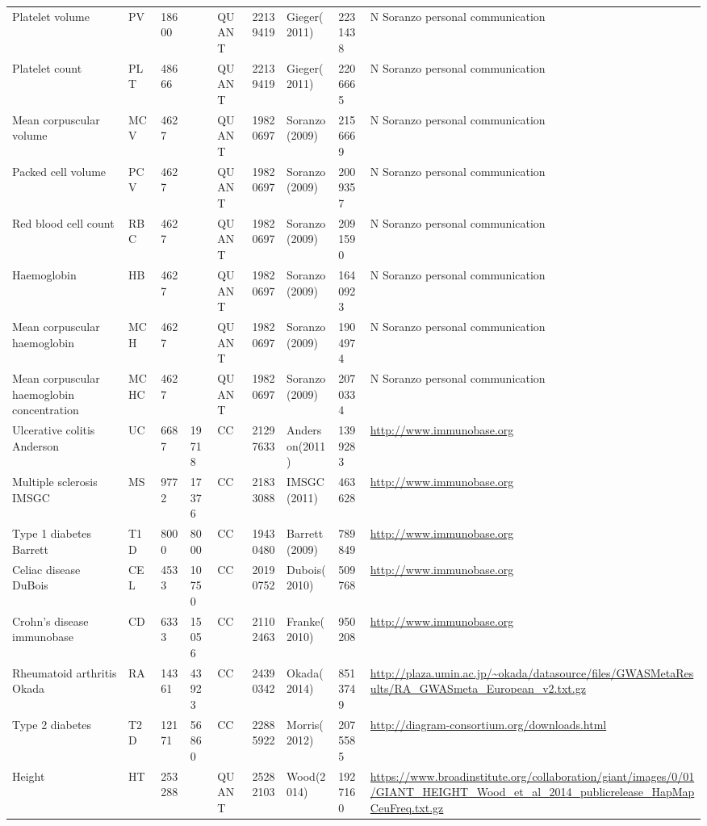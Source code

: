 \begin{center}
\begin{longtable}{| L{5cm} | C{1.2cm} | C{1cm} | C{1.5cm} | C{1.5cm} | C{1.5cm} | L{2.5cm} | R{1.5cm} | L{4cm} |}
Platelet volume & PV & 18600 &  & QUANT & 22139419 & Gieger(2011) & 2231438  & N Soranzo personal communication \\
Platelet count & PLT & 48666 &  & QUANT & 22139419 & Gieger(2011) & 2206665  & N Soranzo personal communication \\
Mean corpuscular volume & MCV & 4627 &  & QUANT & 19820697 & Soranzo(2009) & 2156669  & N Soranzo personal communication \\
Packed cell volume & PCV & 4627 &  & QUANT & 19820697 & Soranzo(2009) & 2009357  & N Soranzo personal communication \\
Red blood cell count & RBC & 4627 &  & QUANT & 19820697 & Soranzo(2009) & 2091590  & N Soranzo personal communication \\
Haemoglobin & HB & 4627 &  & QUANT & 19820697 & Soranzo(2009) & 1640923  & N Soranzo personal communication \\
Mean corpuscular haemoglobin & MCH & 4627 &  & QUANT & 19820697 & Soranzo(2009) & 1904974  & N Soranzo personal communication \\
Mean corpuscular haemoglobin concentration & MCHC & 4627 &  & QUANT & 19820697 & Soranzo(2009) & 2070334  & N Soranzo personal communication \\
Ulcerative colitis Anderson & UC & 6687 & 19718 & CC & 21297633 & Anderson(2011) & 1399283  & \url{http://www.immunobase.org} \\
Multiple sclerosis IMSGC & MS & 9772 & 17376 & CC & 21833088 & IMSGC(2011) & 463628  & \url{http://www.immunobase.org} \\
Type 1 diabetes Barrett & T1D & 8000 & 8000 & CC & 19430480 & Barrett(2009) & 789849  & \url{http://www.immunobase.org} \\
Celiac disease DuBois & CEL & 4533 & 10750 & CC & 20190752 & Dubois(2010) & 509768  & \url{http://www.immunobase.org} \\
Crohn's disease immunobase & CD & 6333 & 15056 & CC & 21102463 & Franke(2010) & 950208  & \url{http://www.immunobase.org} \\
Rheumatoid arthritis Okada & RA & 14361 & 43923 & CC & 24390342 & Okada(2014) & 8513749  & \url{http://plaza.umin.ac.jp/\~okada/datasource/files/GWASMetaResults/RA\_GWASmeta\_European\_v2.txt.gz} \\
Type 2 diabetes & T2D & 12171 & 56860 & CC & 22885922 & Morris(2012) & 2075585  & \url{http://diagram-consortium.org/downloads.html} \\
Height & HT & 253288 &  & QUANT & 25282103 & Wood(2014) & 1927160  & \url{https://www.broadinstitute.org/collaboration/giant/images/0/01/GIANT\_HEIGHT\_Wood\_et\_al\_2014\_publicrelease\_HapMapCeuFreq.txt.gz} \\

\end{longtable}
\end{center}
